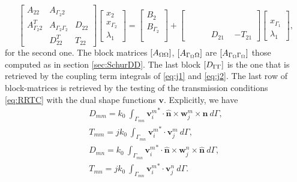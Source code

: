 \begin{equation}
\label{eq:DDFETI2}
\begin{bmatrix}
A_{22} & A_{\Gamma_2 2} & \\
A_{\Gamma_2 2}^T & A_{\Gamma_2 \Gamma_2} & D_{22}\\
 & D_{22}^T  & T_{22}
\end{bmatrix}
\begin{bmatrix}
x_{2}\\
x_{\Gamma_2}\\
\lambda_{1}
\end{bmatrix}
=
\begin{bmatrix}
B_{2}\\
B_{\Gamma_2}\\
\phantom{x}
\end{bmatrix}
+
\begin{bmatrix}
\phantom{-}\phantom{A} & \phantom{-}\phantom{A} & \phantom{A}\\
\phantom{A} & \phantom{A} & \phantom{A}\\
\phantom{A} & D_{21}  & -T_{21}
\end{bmatrix}
\begin{bmatrix}
\phantom{x}\\
x_{\Gamma_1}\\
\lambda_{1}
\end{bmatrix},
\end{equation}
\noindent for the second one. The block matrices $\left[A_{\Omega\Omega}\right]$, $\left[A_{\Gamma_{\Omega}\Omega}\right]$ are $\left[A_{\Gamma_{\Omega}\Gamma_{\Omega}}\right]$ those computed as in section \ref{sec:SchurDD}. The last block $\left[D_{\Gamma\Gamma}\right]$ is the one that is retrieved by the coupling term integrals of \eqref{eq:j1} and \eqref{eq:j2}. The last row of block-matrices is retrieved by the testing of the transmission conditions \eqref{eq:RRTC} with the dual shape functions $\mathbf{v}$.
Explicitly, we have
\begin{gather*}
D_{mm} = k_0 \ \int_{\Gamma_{mn}} {\mathbf{v}_i^{m}}^* \cdot \hat{\mathbf{n}} \times\mathbf{w}_j^m \times \hat{\mathbf{n}} \ d\Gamma, \\
T_{mm} = jk_0 \ \int_{\Gamma_{mn}} {\mathbf{v}_i^{m}}^* \cdot \mathbf{v}_j^m \ d\Gamma,\\
D_{mn} = k_0 \ \int_{\Gamma_{mn}} {\mathbf{v}_i^{m}}^* \cdot \hat{\mathbf{n}} \times\mathbf{w}_j^n \times \hat{\mathbf{n}} \ d\Gamma, \\
T_{mn} = jk_0 \ \int_{\Gamma_{mn}} {\mathbf{v}_i^{m}}^* \cdot \mathbf{v}_j^n \ d\Gamma.
\end{gather*}
